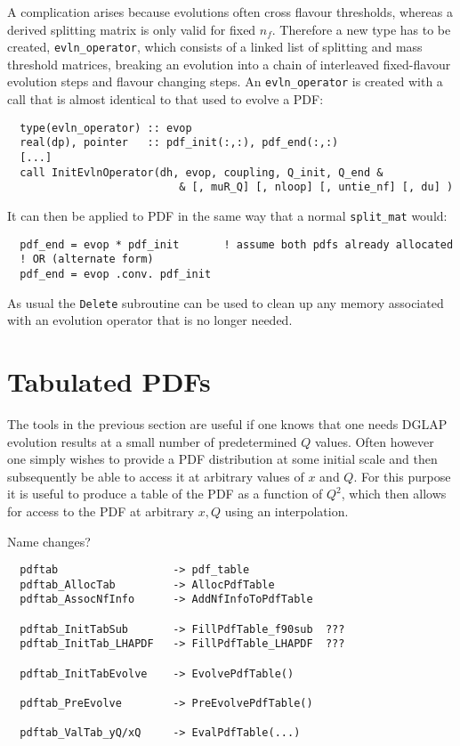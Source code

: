 \documentclass[12pt]{article}
\newcommand{\ttt}[1]{\texttt{#1}}
\begin{document}
A complication arises because evolutions often cross flavour
thresholds, whereas a derived splitting matrix is only valid for fixed
$n_f$. Therefore a new type has to be created, \ttt{evln\_operator},
which consists of a linked list of splitting and mass threshold
matrices, breaking an evolution into a chain of interleaved
fixed-flavour evolution steps and flavour changing steps. An
\ttt{evln\_operator} is created with a call that is almost identical
to that used to evolve a PDF:
\begin{verbatim}
  type(evln_operator) :: evop
  real(dp), pointer   :: pdf_init(:,:), pdf_end(:,:)
  [...]
  call InitEvlnOperator(dh, evop, coupling, Q_init, Q_end &
                           & [, muR_Q] [, nloop] [, untie_nf] [, du] )
\end{verbatim}
It can then be applied to PDF in the same way that a normal
\ttt{split\_mat} would:
\begin{verbatim}
  pdf_end = evop * pdf_init       ! assume both pdfs already allocated
  ! OR (alternate form) 
  pdf_end = evop .conv. pdf_init  
\end{verbatim}
As usual the \ttt{Delete} subroutine can be used to clean up any
memory associated with an evolution operator that is no longer needed.


\section{Tabulated PDFs}
\label{sec:tabulated-pdfs}

The tools in the previous section are useful if one knows that one
needs DGLAP evolution results at a small number of predetermined $Q$
values. Often however one simply wishes to provide a PDF distribution
at some initial scale and then subsequently be able to access it at
arbitrary values of $x$ and $Q$. For this purpose it is useful to
produce a table of the PDF as a function of $Q^2$, which then allows
for access to the PDF at arbitrary $x, Q$ using an interpolation.

Name changes?
\begin{verbatim}
  pdftab                  -> pdf_table
  pdftab_AllocTab         -> AllocPdfTable
  pdftab_AssocNfInfo      -> AddNfInfoToPdfTable

  pdftab_InitTabSub       -> FillPdfTable_f90sub  ???
  pdftab_InitTab_LHAPDF   -> FillPdfTable_LHAPDF  ???

  pdftab_InitTabEvolve    -> EvolvePdfTable()

  pdftab_PreEvolve        -> PreEvolvePdfTable()

  pdftab_ValTab_yQ/xQ     -> EvalPdfTable(...)       
\end{verbatim}
\end{document}

